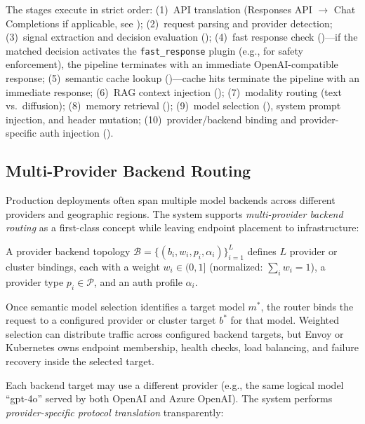 The stages execute in strict order:
(1)~API translation (Responses API $\to$ Chat Completions if applicable, see );
(2)~request parsing and provider detection;
(3)~signal extraction and decision evaluation ();
(4)~fast response check ()---if the matched decision activates the \texttt{fast\_response} plugin (e.g., for safety enforcement), the pipeline terminates with an immediate OpenAI-compatible response;
(5)~semantic cache lookup ()---cache hits terminate the pipeline with an immediate response;
(6)~RAG context injection ();
(7)~modality routing (text vs.\ diffusion);
(8)~memory retrieval ();
(9)~model selection (), system prompt injection, and header mutation;
(10)~provider/backend binding and provider-specific auth injection ().

\subsection{Multi-Provider Backend Routing}
\label{subsec:provider_backend}

Production deployments often span multiple model backends across different providers and geographic regions.
The system supports \emph{multi-provider backend routing} as a first-class concept while leaving endpoint placement to infrastructure:

\begin{definition}
A provider backend topology $\mathcal{B} = \{(b_i, w_i, p_i, \alpha_i)\}_{i=1}^{L}$ defines $L$ provider or cluster bindings, each with a weight $w_i \in (0, 1]$ (normalized: $\sum_i w_i = 1$), a provider type $p_i \in \mathcal{P}$, and an auth profile $\alpha_i$.
\end{definition}

Once semantic model selection identifies a target model $m^*$, the router binds the request to a configured provider or cluster target $b^*$ for that model.
Weighted selection can distribute traffic across configured backend targets, but Envoy or Kubernetes owns endpoint membership, health checks, load balancing, and failure recovery inside the selected target.

Each backend target may use a different provider (e.g., the same logical model ``gpt-4o'' served by both OpenAI and Azure OpenAI).
The system performs \emph{provider-specific protocol translation} transparently:

